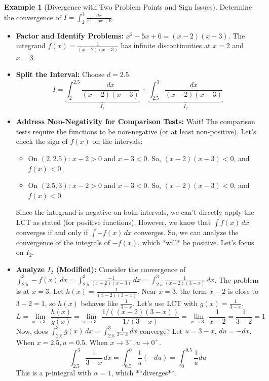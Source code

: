 \documentclass[11pt]{article}
\theoremstyle{definition}
\newtheorem{example}[theorem]{Example}
\newcommand{\dx}{\, dx} %
\begin{document}
\begin{example}[Divergence with Two Problem Points and Sign Issues] \label{ex:x2-5x+6}
    Determine the convergence of $I = \int_2^3 \frac{dx}{x^2 - 5x + 6}$.
    \begin{itemize}
        \item \textbf{Factor and Identify Problems:} $x^2 - 5x + 6 = (x-2)(x-3)$. The integrand $f(x) = \frac{1}{(x-2)(x-3)}$ has infinite discontinuities at $x=2$ and $x=3$.
        \item \textbf{Split the Interval:} Choose $d=2.5$.
          \[ I = \underbrace{\int_2^{2.5} \frac{dx}{(x-2)(x-3)}}_{I_1} + \underbrace{\int_{2.5}^3 \frac{dx}{(x-2)(x-3)}}_{I_2} \]
        \item \textbf{Address Non-Negativity for Comparison Tests:} Wait! The comparison tests require the functions to be non-negative (or at least non-positive). Let's check the sign of $f(x)$ on the intervals:
          \begin{itemize}
              \item On $(2, 2.5)$: $x-2 > 0$ and $x-3 < 0$. So, $(x-2)(x-3) < 0$, and $f(x) < 0$.
              \item On $(2.5, 3)$: $x-2 > 0$ and $x-3 < 0$. So, $(x-2)(x-3) < 0$, and $f(x) < 0$.
          \end{itemize}
          Since the integrand is negative on both intervals, we can't directly apply the LCT as stated (for positive functions). However, we know that $\int f(x) \dx$ converges if and only if $\int -f(x) \dx$ converges. So, we can analyze the convergence of the integrals of $-f(x)$, which *will* be positive. Let's focus on $I_2$.
        \item \textbf{Analyze $I_2$ (Modified):} Consider the convergence of $\int_{2.5}^3 -f(x) \dx = \int_{2.5}^3 \frac{-1}{(x-2)(x-3)} \dx = \int_{2.5}^3 \frac{1}{(x-2)(3-x)} \dx$.
          The problem is at $x=3$. Let $h(x) = \frac{1}{(x-2)(3-x)}$. Near $x=3$, the term $x-2$ is close to $3-2=1$, so $h(x)$ behaves like $\frac{1}{3-x}$. Let's use LCT with $g(x) = \frac{1}{3-x}$.
          \[
          L = \lim_{x \to 3^-} \frac{h(x)}{g(x)} = \lim_{x \to 3^-} \frac{1/((x-2)(3-x))}{1/(3-x)} = \lim_{x \to 3^-} \frac{1}{x-2} = \frac{1}{3-2} = 1
          \]
          Now, does $\int_{2.5}^3 g(x) \dx = \int_{2.5}^3 \frac{1}{3-x} \dx$ converge? Let $u=3-x$, $du=-dx$. When $x=2.5, u=0.5$. When $x \to 3^-, u \to 0^+$.
          \[ \int_{2.5}^3 \frac{1}{3-x} \dx = \int_{0.5}^0 \frac{1}{u}(-du) = \int_0^{0.5} \frac{1}{u} du \]
          This is a p-integral with $\alpha=1$, which **diverges**.

\end{itemize}
\end{example}
\end{document}
